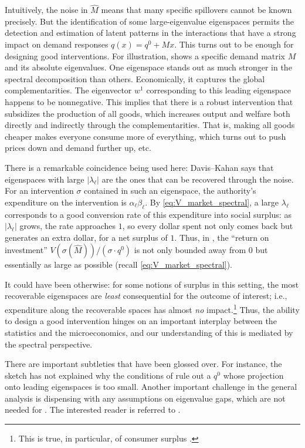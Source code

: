 \documentclass{notices}
\theoremstyle{definition}\newtheorem{problem}{Problem}
\theoremstyle{definition} \newtheorem{remark}{Remark}
\theoremstyle{definition} \newtheorem{claim}{Claim}
\theoremstyle{definition} \newtheorem{thm}{Theorem}
\theoremstyle{definition} \newtheorem*{thmNoNum}{Theorem}
\theoremstyle{definition} \newtheorem{definition}{Definition}
\theoremstyle{definition} \theoremstyle{remark}
\theoremstyle{definition} \newtheorem{note}{Note}
\theoremstyle{definition} \newtheorem{notation}{Notation}
\theoremstyle{definition} \theoremstyle{plain}
\theoremstyle{definition} \newtheorem{condition}{Condition}
\theoremstyle{definition} \newtheorem{lem}{Lemma}
\theoremstyle{definition} \newtheorem{corollary}{Corollary}
\theoremstyle{definition} \newtheorem{prop}{Proposition}
\theoremstyle{definition} \newtheorem{ax}{Axiom}
\theoremstyle{definition} \newtheorem{assumption}{Assumption}
\theoremstyle{definition} \newtheorem{example}{Example}
\theoremstyle{definition} \newtheorem{rmk}{Remark}
\theoremstyle{definition} \newtheorem{res}{Result}
\theoremstyle{definition} \newtheorem{que}{Question}
\theoremstyle{definition} \newtheorem{conjecture}{Conjecture}
\theoremstyle{definition}
\begin{document}
Intuitively, the noise in $\widehat{M}$ means that many specific spillovers cannot be known precisely. But the identification of some large-eigenvalue eigenspaces permits the detection and estimation of latent patterns in the interactions that have a strong impact on demand responses $q(x)=q^0+Mx$. This turns out to be enough for designing good interventions. For illustration,  shows a specific demand matrix \(M\) and its absolute eigenvalues. One eigenspace stands out as much stronger in the spectral decomposition than others. Economically, it captures the global complementarities. The eigenvector $w^1$ corresponding to this leading eigenspace happens to be nonnegative. This implies that there is a robust intervention that subsidizes the production of all goods, which increases output and welfare both directly and indirectly through the complementarities. That is, making all goods cheaper makes everyone consume more of everything, which turns out to push prices down and demand further up, etc.

There is a remarkable coincidence being used here: Davis--Kahan says that eigenspaces with large  $|\lambda_\ell|$ are the ones that can be recovered through the noise. For an intervention $\sigma$ contained in such an eigenspace, the authority's expenditure on the intervention is $\alpha_\ell \beta_\ell$.  By \cref{eq:V_market_spectral}, a large $\lambda_\ell$ corresponds to a good conversion rate of this expenditure into social surplus: as $|\lambda_\ell|$ grows, the rate approaches $1$, so every dollar spent not only comes back but generates an extra dollar, for a net surplus of $1$. Thus, in , the ``return on investment'' $V(\sigma(\widehat{M}))/(\sigma \cdot q^0)$ is not only bounded away from $0$ but essentially as large as possible (recall \cref{eq:V_market_spectral}).

It could have been otherwise: for some notions of surplus in this setting, the most recoverable eigenspaces are \emph{least} consequential for the outcome of interest; i.e., expenditure along the recoverable spaces has almost \emph{no} impact.\footnote{This is true, in particular, of consumer surplus \cite{GaleottiGolubGoyalTalamasTamuz2026}.} Thus, the ability to design a good intervention hinges on an important interplay between the statistics and the microeconomics, and our understanding of this is mediated by the spectral perspective.

There are important subtleties that have been glossed over. For instance, the sketch has not explained why the conditions of  rule out a $q^0$ whose projection onto leading eigenspaces is too small. Another important challenge in the general analysis is dispensing with any assumptions on eigenvalue gaps, which are not needed for .  The interested reader is referred to \cite{GaleottiGolubGoyalTalamasTamuz2026}.
\end{document}
